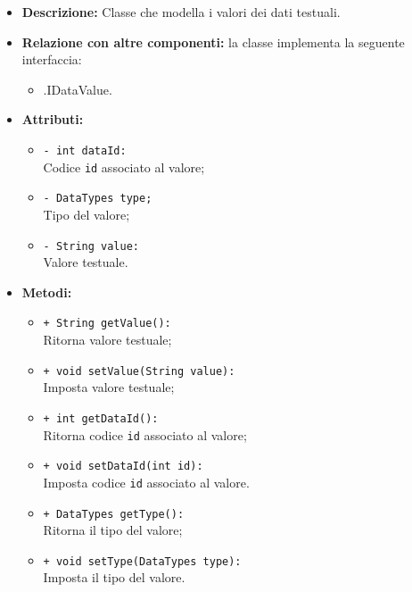 \begin{flushleft}
\begin{itemize}
\item \textbf{Descrizione:} Classe che modella i valori dei dati testuali.
\item \textbf{Relazione con altre componenti:} la classe implementa la seguente interfaccia:
		\begin{itemize}
			\item \smodel{}.IDataValue.
		\end{itemize}
\item \textbf{Attributi:}
\begin{sloppypar}
\begin{itemize}
\item \texttt{- int dataId:}\\ Codice \texttt{id} associato al valore;
\item \texttt{- DataTypes type;}\\ Tipo del valore;
\item \texttt{- String value:}\\ Valore testuale.
\end{itemize}
\end{sloppypar}
\item \textbf{Metodi:}
\begin{sloppypar}
\begin{itemize}
\item \texttt{+ String getValue():}\\ Ritorna valore testuale;
\item \texttt{+ void setValue(String value):}\\ Imposta valore testuale;
\item \texttt{+ int getDataId():}\\ Ritorna codice \texttt{id} associato al valore;
\item \texttt{+ void setDataId(int id):}\\ Imposta codice \texttt{id} associato al valore.
\item \texttt{+ DataTypes getType():}\\ Ritorna il tipo del valore;
\item \texttt{+ void setType(DataTypes type):}\\ Imposta il tipo del valore.
\end{itemize}
\end{sloppypar}
\end{itemize}
\end{flushleft}

